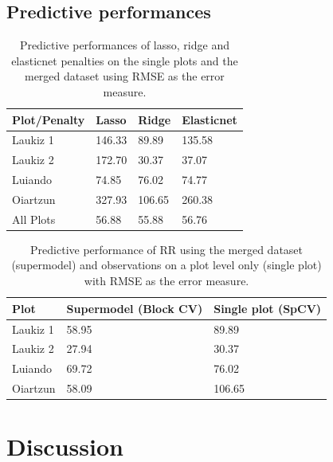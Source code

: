 \documentclass[review]{elsarticle}
\begin{document}
\subsection{Predictive performances}

\begin{table}[b!]
\centering
\caption[t]{Predictive performances of lasso, ridge and elasticnet penalties on the single plots and the merged dataset using \ac{RMSE} as the error measure.}
\begingroup\footnotesize
\begin{tabular}{llll}
	\\
	Plot/Penalty & Lasso  & Ridge  & Elasticnet \\
	\hline
	Laukiz 1     & 146.33 & 89.89  & 135.58     \\
	Laukiz 2     & 172.70 & 30.37  & 37.07      \\
	Luiando      & 74.85  & 76.02  & 74.77      \\
	Oiartzun     & 327.93 & 106.65 & 260.38     \\
	All Plots    & 56.88  & 55.88  & 56.76      \\
	\bottomrule
\end{tabular}
\endgroup
\label{tab:penalty_comparison}
\end{table}


\begin{table}[b!]
\centering
\caption[t]{Predictive performance of \ac{RR} using the merged dataset (supermodel) and observations on a plot level only (single plot) with \ac{RMSE} as the error measure.}
\begingroup\footnotesize
\begin{tabular}{lll}
	\\
	Plot     & Supermodel (Block CV) & Single plot (SpCV) \\
	\hline
	Laukiz 1 & 58.95                 & 89.89              \\
	Laukiz 2 & 27.94                 & 30.37              \\
	Luiando  & 69.72                 & 76.02              \\
	Oiartzun & 58.09                 & 106.65             \\
	\bottomrule
\end{tabular}
\endgroup
\label{tab:supermodel_performance}
\end{table}

\section{Discussion}
\end{document}
